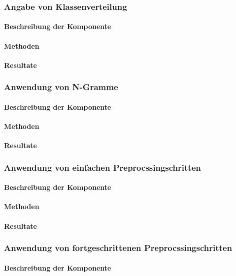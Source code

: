 \subsubsection{Angabe von Klassenverteilung}
\paragraph{Beschreibung der Komponente}
\paragraph{Methoden}
\paragraph{Resultate}
\subsubsection{Anwendung von N-Gramme}
\paragraph{Beschreibung der Komponente}
\paragraph{Methoden}
\paragraph{Resultate}
\subsubsection{Anwendung von einfachen Preprocssingschritten}
\paragraph{Beschreibung der Komponente}
\paragraph{Methoden}
\paragraph{Resultate}
\subsubsection{Anwendung von fortgeschrittenen Preprocssingschritten}
\paragraph{Beschreibung der Komponente}
